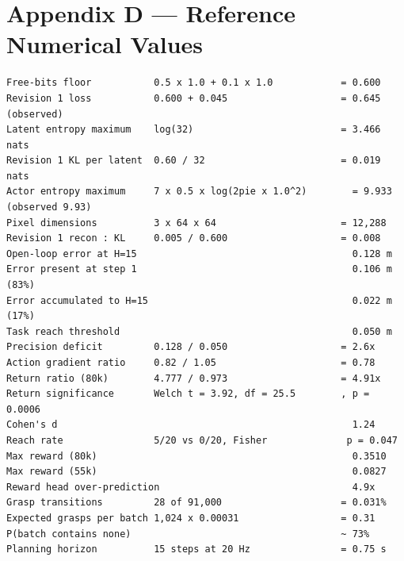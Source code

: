 \documentclass[12pt,a4paper,oneside]{report}
\begin{document}
\hypertarget{appendix-d-reference-numerical-values}{%
\section{Appendix D --- Reference Numerical Values}\label{appendix-d-reference-numerical-values}}

\begin{verbatim}
Free-bits floor           0.5 x 1.0 + 0.1 x 1.0            = 0.600
Revision 1 loss           0.600 + 0.045                    = 0.645  (observed)
Latent entropy maximum    log(32)                          = 3.466 nats
Revision 1 KL per latent  0.60 / 32                        = 0.019 nats
Actor entropy maximum     7 x 0.5 x log(2pie x 1.0^2)        = 9.933  (observed 9.93)
Pixel dimensions          3 x 64 x 64                      = 12,288
Revision 1 recon : KL     0.005 / 0.600                    = 0.008
Open-loop error at H=15                                      0.128 m
Error present at step 1                                      0.106 m  (83%)
Error accumulated to H=15                                    0.022 m  (17%)
Task reach threshold                                         0.050 m
Precision deficit         0.128 / 0.050                    = 2.6x
Action gradient ratio     0.82 / 1.05                      = 0.78
Return ratio (80k)        4.777 / 0.973                    = 4.91x
Return significance       Welch t = 3.92, df = 25.5        , p = 0.0006
Cohen's d                                                    1.24
Reach rate                5/20 vs 0/20, Fisher              p = 0.047
Max reward (80k)                                             0.3510
Max reward (55k)                                             0.0827
Reward head over-prediction                                  4.9x
Grasp transitions         28 of 91,000                     = 0.031%
Expected grasps per batch 1,024 x 0.00031                  = 0.31
P(batch contains none)                                     ~ 73%
Planning horizon          15 steps at 20 Hz                = 0.75 s
\end{verbatim}
\end{document}
